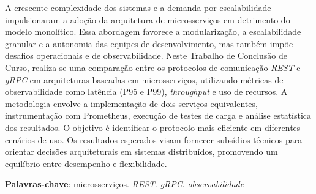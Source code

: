 \setlength{\absparsep}{18pt} %
\begin{resumo}
	\SingleSpacing
	A crescente complexidade dos sistemas e a demanda por escalabilidade impulsionaram a adoção da arquitetura de microsserviços em detrimento do modelo monolítico. Essa abordagem favorece a modularização, a escalabilidade granular e a autonomia das equipes de desenvolvimento, mas também impõe desafios operacionais e de observabilidade. Neste Trabalho de Conclusão de Curso, realiza-se uma comparação entre os protocolos de comunicação \textit{REST} e \textit{gRPC} em arquiteturas baseadas em microsserviços, utilizando métricas de observabilidade como latência (P95 e P99), \textit{throughput} e uso de recursos. A metodologia envolve a implementação de dois serviços equivalentes, instrumentação com Prometheus, execução de testes de carga e análise estatística dos resultados. O objetivo é identificar o protocolo mais eficiente em diferentes cenários de uso. Os resultados esperados visam fornecer subsídios técnicos para orientar decisões arquiteturais em sistemas distribuídos, promovendo um equilíbrio entre desempenho e flexibilidade.
	
	\textbf{Palavras-chave}: microsserviços. \textit{REST}. \textit{gRPC}. \textit{observabilidade}
\end{resumo}